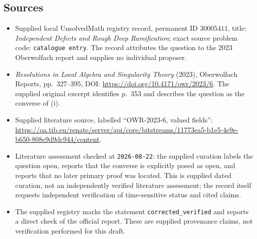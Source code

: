 \documentclass[11pt]{article}
\begin{document}
\subsection{Sources}
\begin{itemize}
\item Supplied local UnsolvedMath registry record, permanent ID \(30005411\), title: \emph{Independent Defects and Rough Deep Ramification}; exact source problem code: \texttt{catalogue entry}. The record attributes the question to the 2023 Oberwolfach report and supplies no individual proposer.
\item \emph{Resolutions in Local Algebra and Singularity Theory} (2023), Oberwolfach Reports, pp.~327--395, DOI: \url{https://doi.org/10.4171/owr/2023/6}. The supplied original excerpt identifies p.~353 and describes the question as the converse of (i).
\item Supplied literature source, labelled ``OWR-2023-6, valued fields'': \url{https://oa.tib.eu/renate/server/api/core/bitstreams/11773ea5-b1e5-4e9e-b650-808e9d9dc944/content}.
\item Literature assessment checked at \texttt{2026-08-22}: the supplied curation labels the question open, reports that the converse is explicitly posed as open, and reports that no later primary proof was located. This is supplied dated curation, not an independently verified literature assessment; the record itself requests independent verification of time-sensitive status and cited claims.
\item The supplied registry marks the statement \texttt{corrected\_verified} and reports a direct check of the official report. These are supplied provenance claims, not verification performed for this draft.
\end{itemize}
\end{document}
